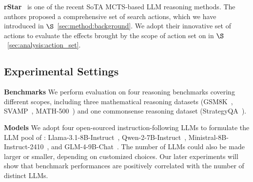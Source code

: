 \textbf{rStar}~\cite{qi2024mutual} is one of the recent SoTA MCTS-based LLM reasoning methods.
The authors proposed a comprehensive set of search actions, which we have introduced in $\S$~\ref{sec:method:background}.
We adopt their innovative set of actions to evaluate the effects brought by the scope of action set on \mosa{} in $\S$~\ref{sec:analysis:action_set}.











% 


\subsection{Experimental Settings}
\label{sec:exp:exp_settings}

\textbf{Benchmarks}
\hspace{5pt}
We perform evaluation on four reasoning benchmarks covering different scopes, including three mathematical reasoning datasets (GSM8K~\cite{gsm8k}, SVAMP~\cite{svamp}, \mbox{MATH-500}~\cite{MATH,lightman2023lets}) and one commonsense reasoning dataset (StrategyQA~\cite{strategyqa}).


\textbf{Models}
\hspace{5pt}
We adopt four open-sourced instruction-following LLMs to formulate the LLM pool of \mosa{}: Llama-3.1-8B-Instruct~\cite{grattafiori2024llama3herdmodels}, Qwen-2-7B-Instruct~\cite{yang2024qwen2technicalreport}, Ministral-8B-Instruct-2410~\cite{ministral}, and GLM-4-9B-Chat~\cite{glm2024chatglm}.
The number of LLMs could also be made larger or smaller, depending on customized choices.
Our later experiments will show that benchmark performances are positively correlated with the number of distinct LLMs.




